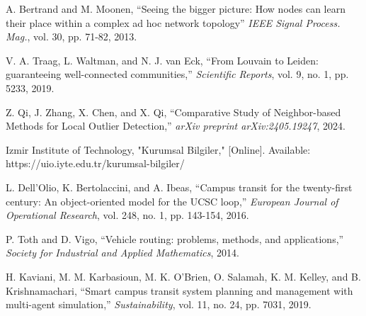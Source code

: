 \documentclass[12pt,twoside,a4paper,fleqn,bibliography=totocnumbered]{report}
\begin{document}

\setcounter{page}{1}
\cleardoublepage

\tableofcontents
\cleardoublepage
{}
\setcounter{page}{1}








\cleardoublepage
{}
%
%    	             

\begin{thebibliography}{1}

 A. Bertrand and M. Moonen, ``Seeing the bigger picture: How nodes can learn their place within a complex ad hoc network topology'' \emph{IEEE Signal Process. Mag.}, vol. 30, pp. 71-82, 2013.

 V. A. Traag, L. Waltman, and N. J. van Eck, ``From Louvain to Leiden: guaranteeing well-connected communities,'' \emph{Scientific Reports}, vol. 9, no. 1, pp. 5233, 2019.

 Z. Qi, J. Zhang, X. Chen, and X. Qi, ``Comparative Study of Neighbor-based Methods for Local Outlier Detection,'' \emph{arXiv preprint arXiv:2405.19247}, 2024.

 Izmir Institute of Technology, "Kurumsal Bilgiler," [Online]. Available: https://uio.iyte.edu.tr/kurumsal-bilgiler/

 L. Dell'Olio, K. Bertolaccini, and A. Ibeas, ``Campus transit for the twenty-first century: An object-oriented model for the UCSC loop,'' \emph{European Journal of Operational Research}, vol. 248, no. 1, pp. 143-154, 2016.

 P. Toth and D. Vigo, ``Vehicle routing: problems, methods, and applications,'' \emph{Society for Industrial and Applied Mathematics}, 2014.

 H. Kaviani, M. M. Karbasioun, M. K. O'Brien, O. Salamah, K. M. Kelley, and B. Krishnamachari, ``Smart campus transit system planning and management with multi-agent simulation,'' \emph{Sustainability}, vol. 11, no. 24, pp. 7031, 2019.


\end{thebibliography}
\end{document}
